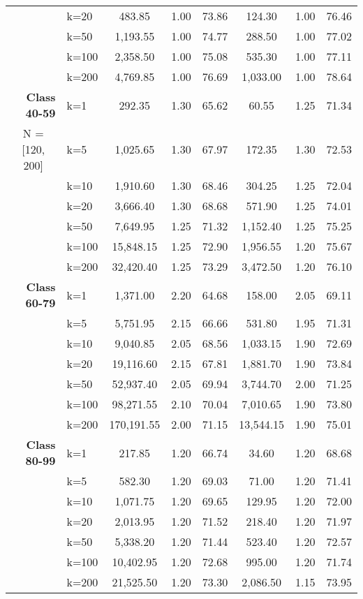 \begin{table}[htbp]
\begin{tabular}{|l|l|c|c|c|c|c|c|}
     & k=20 & 483.85 & 1.00 & 73.86 & 124.30 & 1.00 & 76.46 \\ 
     & k=50 & 1,193.55 & 1.00 & 74.77 & 288.50 & 1.00 & 77.02 \\ 
     & k=100 & 2,358.50 & 1.00 & 75.08 & 535.30 & 1.00 & 77.11 \\ 
     & k=200 & 4,769.85 & 1.00 & 76.69 & 1,033.00 & 1.00 & 78.64 \\ \hline
    \multicolumn{1}{|r|}{\textbf{Class 40-59}} & k=1 & 292.35 & 1.30 & 65.62 & 60.55 & 1.25 & 71.34 \\ 
    \multicolumn{1}{|c|}{N = [120, 200]} & k=5 & 1,025.65 & 1.30 & 67.97 & 172.35 & 1.30 & 72.53 \\ 
     & k=10 & 1,910.60 & 1.30 & 68.46 & 304.25 & 1.25 & 72.04 \\ 
     & k=20 & 3,666.40 & 1.30 & 68.68 & 571.90 & 1.25 & 74.01 \\ 
     & k=50 & 7,649.95 & 1.25 & 71.32 & 1,152.40 & 1.25 & 75.25 \\ 
     & k=100 & 15,848.15 & 1.25 & 72.90 & 1,956.55 & 1.20 & 75.67 \\ 
     & k=200 & 32,420.40 & 1.25 & 73.29 & 3,472.50 & 1.20 & 76.10 \\ \hline
    \multicolumn{1}{|r|}{\textbf{Class 60-79}} & k=1 & 1,371.00 & 2.20 & 64.68 & 158.00 & 2.05 & 69.11 \\ 
     & k=5 & 5,751.95 & 2.15 & 66.66 & 531.80 & 1.95 & 71.31 \\ 
     & k=10 & 9,040.85 & 2.05 & 68.56 & 1,033.15 & 1.90 & 72.69 \\ 
     & k=20 & 19,116.60 & 2.15 & 67.81 & 1,881.70 & 1.90 & 73.84 \\ 
     & k=50 & 52,937.40 & 2.05 & 69.94 & 3,744.70 & 2.00 & 71.25 \\ 
     & k=100 & 98,271.55 & 2.10 & 70.04 & 7,010.65 & 1.90 & 73.80 \\ 
     & k=200 & 170,191.55 & 2.00 & 71.15 & 13,544.15 & 1.90 & 75.01 \\ \hline
    \multicolumn{1}{|r|}{\textbf{Class 80-99}} & k=1 & 217.85 & 1.20 & 66.74 & 34.60 & 1.20 & 68.68 \\ 
     & k=5 & 582.30 & 1.20 & 69.03 & 71.00 & 1.20 & 71.41 \\ 
     & k=10 & 1,071.75 & 1.20 & 69.65 & 129.95 & 1.20 & 72.00 \\ 
     & k=20 & 2,013.95 & 1.20 & 71.52 & 218.40 & 1.20 & 71.97 \\ 
     & k=50 & 5,338.20 & 1.20 & 71.44 & 523.40 & 1.20 & 72.57 \\ 
     & k=100 & 10,402.95 & 1.20 & 72.68 & 995.00 & 1.20 & 71.74 \\ 
     & k=200 & 21,525.50 & 1.20 & 73.30 & 2,086.50 & 1.15 & 73.95 \\ \hline
    \end{tabular}
    \label{results:usecase_summary}
    \end{table}
    